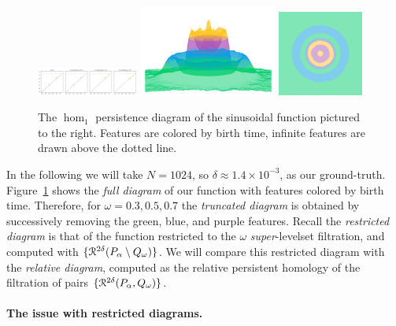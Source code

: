 \begin{figure}[htbp]\label{fig:ripple1}
  \centering
  \includegraphics[trim=0 0 790 0, clip, width=0.3\textwidth]{scripts/figures/matching2/full-dgm.png}
  \includegraphics[trim=-350 -800 -700 -300, clip, width=0.4\textwidth]{scripts/figures/matching2/full-surf_side-lowres.png}
  \includegraphics[trim=0 -800 0 0, width=0.25\textwidth]{scripts/figures/matching2/full-surf_top-lowres.png}
  \caption{The $\hom_1$ persistence diagram of the sinusoidal function pictured to the right.
  Features are colored by birth time, infinite features are drawn above the dotted line.}
\end{figure}

In the following we will take $N = 1024$, so $\delta\approx 1.4\times 10^{-3}$, as our ground-truth.
Figure~\ref{fig:ripple1} shows the \emph{full diagram} of our function with features colored by birth time.
Therefore, for $\omega = 0.3, 0.5, 0.7$ the \emph{truncated diagram} is obtained by successively removing the green, blue, and purple features.
Recall the \emph{restricted diagram} is that of the function restricted to the $\omega$ \emph{super}-levelset filtration, and computed with $\{\mathcal{R}^{2\delta}(P_\alpha\setminus Q_\omega)\}$.
We will compare this restricted diagram with the \emph{relative diagram}, computed as the relative persistent homology of the filtration of pairs $\{\mathcal{R}^{2\delta}(P_\alpha, Q_\omega)\}$.

\paragraph{The issue with restricted diagrams.}

